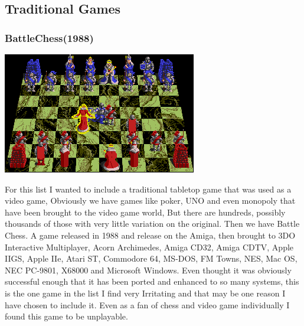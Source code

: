 \documentclass{article}
\begin{document}
\clearpage

\subsection{Traditional Games}
\subsubsection{BattleChess(1988)}
\begin{minipage}{0.43\textwidth}
\includegraphics[width=\linewidth]{battlechess}
\end{minipage} \hfill
\begin{minipage}{0.55\textwidth}\raggedright
For this list I wanted to include a traditional tabletop game that was used as a video game, Obviously we have games like poker, UNO and even monopoly that have been brought to the video game world, But there are hundreds, possibly thousands of those with very little variation on the original. Then we have Battle Chess. A game released in 1988 and release on the Amiga, then brought to  3DO Interactive Multiplayer, Acorn Archimedes, Amiga CD32, Amiga CDTV, Apple IIGS, Apple IIe, Atari ST, Commodore 64, MS-DOS, FM Towns, NES, Mac OS, NEC PC-9801, X68000 and Microsoft Windows. Even thought it was obviously successful enough that it has been ported and enhanced to so many systems, this is the one game in the list I find very Irritating and that may be one reason I have chosen to include it. Even as a fan of chess and video game individually I found this game to be unplayable.
\end{minipage} \newline
\end{document}
